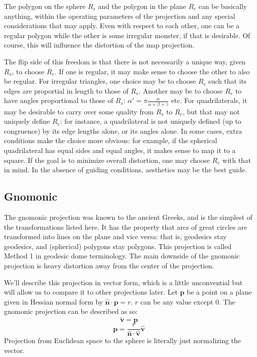 \documentclass{amsart}[12pt]
\begin{document}
The polygon on the sphere $R_s$ and the polygon in the plane $R_e$ can be
basically anything, within the operating parameters of the projection and any
special considerations that may apply. Even with respect to each other, one
can be a regular polygon while the other is some irregular monster, if that is
desirable. Of course, this will influence the distortion of the map
projection.

The flip side of this freedom is that there is not
necessarily a unique way, given $R_s$, to choose $R_e$. If one is regular,
it may make sense to choose the other to also be regular. For irregular
triangles, one choice may be to choose $R_e$ such that its edges are
proportial in length to those of $R_s$. Another may be to choose $R_e$ to have
angles proportional to those of $R_s$: $\alpha' = \pi
\frac{\alpha}{\alpha+\beta+\gamma}$ etc. For quadrilaterals, it may be
desirable to carry over some quality from $R_s$ to $R_e$, but that may not
uniquely define $R_e$: for instance, a quadrilateral is not uniquely defined
(up to congruence) by its edge lengths alone, or its angles alone. In some
cases, extra conditions make the choice more obvious: for example, if the
spherical quadrilateral has equal sides and equal angles, it makes sense to
map it to a square. If the goal is to minimize overall distortion, one may
choose $R_e$ with that in mind. In the absence of guiding conditions,
aesthetics may be the best guide.

\subsection{Gnomonic}
The gnomonic projection was known to the ancient Greeks, and is the simplest
of the transformations listed here.\cite{snyder87} It has the property that
arcs of great circles are transformed into lines on the plane and vice versa:
that is, geodesics stay geodesics, and (spherical) polygons stay polygons. This
projection is called Method 1 in geodesic dome terminology.\cite{kenner} The
main downside of the gnomonic projection is heavy distortion away from the
center of the projection.

We'll describe this projection in vector form, which is a little unconvential
but will allow us to compare it to other projections later.
Let $\mathbf p$ be a point on a plane given in Hessian normal form by
$\hat{\mathbf n} \cdot \mathbf p = r$. $r$ can be any value except 0.
The gnomonic projection can be described as so:
\begin{equation}
  \widetilde{\mathbf v} = \mathbf p
\end{equation}
\begin{equation}
\mathbf p = \frac{r}
  {\hat{\mathbf n} \cdot \hat{\mathbf v}}\hat{\mathbf v}
\end{equation}
Projection from Euclidean space to the sphere is literally just
normalizing the vector.
\end{document}
